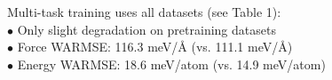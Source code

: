 \documentclass[preview]{standalone}
\begin{document}
\begin{center}
Multi-task training uses all datasets (see Table 1): \\
            $\bullet$ Only slight degradation on pretraining datasets \\
            $\bullet$ Force WARMSE: 116.3 meV/Å (vs. 111.1 meV/Å) \\
            $\bullet$ Energy WARMSE: 18.6 meV/atom (vs. 14.9 meV/atom)
\end{center}
\end{document}

